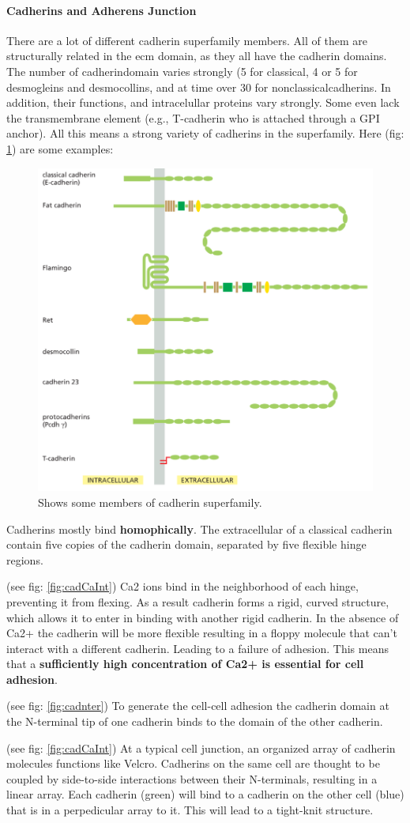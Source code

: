 \documentclass[../main.tex]{subfiles}
\begin{document}
\paragraph{Cadherins and Adherens Junction}

There are a lot of different \gls{cadherin} superfamily members. All of them are structurally related in the ecm domain, as they all have the cadherin domains. The number of \gls{cadherindomain} varies strongly (5 for classical, 4 or 5 for \gls{desmogleins} and \gls{desmocollins}, and at time over 30 for \gls{nonclassicalcadherins}. In addition, their functions, and intracelullar proteins vary strongly. Some even lack the transmembrane element (e.g., T-cadherin who is attached through a GPI anchor). All this means a strong variety of cadherins in the superfamily. Here (fig: \ref{fig:cadsuper}) are some examples: 
\begin{figure}[H]
	\centering
	\includegraphics[width=0.3\linewidth]{cad_super}
	\caption{Shows some members of cadherin superfamily.}
	\label{fig:cadsuper}
\end{figure}

Cadherins mostly bind \textbf{homophically}. The extracellular of a classical cadherin contain five copies of the cadherin domain, separated by five flexible hinge regions. 

(see fig: \ref{fig:cadCaInt}) \gls{Ca2} ions bind in the neighborhood of each hinge, preventing it from flexing. As a result cadherin forms a rigid, curved structure, which allows it to enter in binding with another rigid cadherin. In the absence of Ca2+ the cadherin will be more flexible resulting in a floppy molecule that can't interact with a different cadherin. Leading to a failure of adhesion. This means that a \textbf{sufficiently high concentration of Ca2+ is essential for cell adhesion}.

(see fig: \ref{fig:cadnter}) To generate the cell-cell adhesion the cadherin domain at the N-terminal tip of one cadherin binds to the domain of the other cadherin.

(see fig: \ref{fig:cadCaInt}) At a typical cell junction, an organized array of cadherin molecules functions like Velcro. Cadherins on the same cell are thought to be coupled by side-to-side interactions between their N-terminals, resulting in a linear array. Each cadherin (green) will bind to a cadherin on the other cell (blue) that is in a perpedicular array to it. This will lead to a tight-knit structure.
\end{document}
